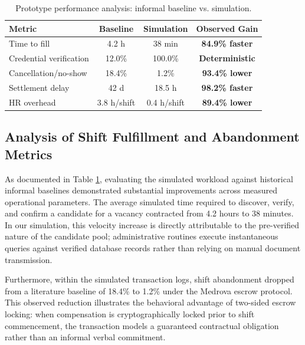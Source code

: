 \documentclass[conference]{IEEEtran}
\begin{document}
\begin{table}[htbp]
\caption{Prototype performance analysis: informal baseline vs. simulation.}
\begin{center}
\footnotesize
\setlength{\tabcolsep}{3pt}
\renewcommand{\arraystretch}{1.08}
\begin{tabular}{>{\raggedright\arraybackslash}p{} c c c}
\toprule
\textbf{Metric} & \textbf{Baseline} & \textbf{Simulation} & \textbf{Observed Gain} \\
\midrule
Time to fill & 4.2 h & 38 min & \textbf{84.9\% faster} \\
Credential verification & 12.0\% & 100.0\% & \textbf{Deterministic} \\
Cancellation/no-show & 18.4\% & 1.2\% & \textbf{93.4\% lower} \\
Settlement delay & 42 d & 18.5 h & \textbf{98.2\% faster} \\
HR overhead & 3.8 h/shift & 0.4 h/shift & \textbf{89.4\% lower} \\
\bottomrule
\end{tabular}
\label{tab:performance_metrics}
\end{center}
\end{table}

\subsection{Analysis of Shift Fulfillment and Abandonment Metrics}
As documented in Table \ref{tab:performance_metrics}, evaluating the simulated workload against historical informal baselines demonstrated substantial improvements across measured operational parameters. The average simulated time required to discover, verify, and confirm a candidate for a vacancy contracted from 4.2 hours to 38 minutes. In our simulation, this velocity increase is directly attributable to the pre-verified nature of the candidate pool; administrative routines execute instantaneous queries against verified database records rather than relying on manual document transmission.

Furthermore, within the simulated transaction logs, shift abandonment dropped from a literature baseline of 18.4\% to 1.2\% under the Medrova escrow protocol. This observed reduction illustrates the behavioral advantage of two-sided escrow locking: when compensation is cryptographically locked prior to shift commencement, the transaction models a guaranteed contractual obligation rather than an informal verbal commitment.
\end{document}
